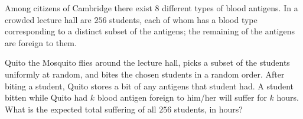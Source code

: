 Among citizens of Cambridge there exist $8$ different types of blood antigens. In a crowded lecture hall are $256$ students, each of whom has a blood type corresponding to a distinct subset of the antigens; the remaining of the antigens are foreign to them.

Quito the Mosquito flies around the lecture hall, picks a subset of the students uniformly at random,
and bites the chosen students in a random order. After biting a student, Quito stores a bit of any antigens that student had. A student bitten while Quito had $k$ blood antigen foreign to him/her will suffer for $k$ hours. What is the expected total suffering of all $256$ students, in hours?